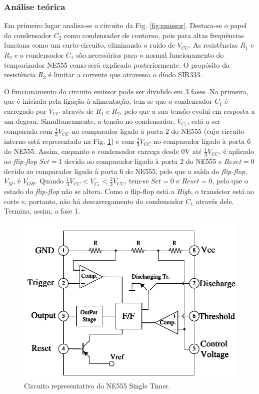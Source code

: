 \subsubsection{Análise teórica}

Em primeiro lugar analisa-se o circuito da Fig. \ref{fig:emissor}. Destaca-se o papel do condensador $C_2$ como condensador de contorno, pois para altas frequências funciona como um curto-circuito, eliminando o ruído de $V_{CC}$. As resistências $R_1$ e $R_2$ e o condensador $C_1$ são necessários para o normal funcionamento do temporizador NE555 como será explicado posteriormente. O propósito da resistência $R_3$ é limitar a corrente que atravessa o díodo SIR333.

O funcionamento do circuito emissor pode ser dividido em 3 fases. Na primeira, que é iniciada pela ligação à alimentação, tem-se que o condensador $C_1$ é carregado por $V_{CC}$ através de $R_1$ e $R_2$, pelo que a sua tensão evolui em resposta a um degrau. Simultaneamente, a tensão no condensador, $V_{C_1}$, está a ser comparada com $\frac{1}{3} V_{CC}$ no comparador ligado à porta 2 do NE555 (cujo circuito interno está representado na Fig. \ref{fig:timer}) e com $\frac{2}{3} V_{CC}$ no comparador ligado à porta 6 do NE555. Assim, enquanto o condensador carrega desde $0 \si{\volt}$ até $\frac{1}{3} V_{CC}$, é aplicado ao \textit{flip-flop} $\textit{Set} = 1$ devido ao comparador ligado à porta 2 do NE555 e $\textit{Reset} = 0$ devido ao comparador ligado à porta 6 do NE555, pelo que a saída do \textit{flip-flop}, $V_M$, é $V_{OH}$. Quando $\frac{1}{3} V_{CC} < V_{C_1} < \frac{2}{3} V_{CC}$, tem-se $\textit{Set} = 0$ e $\textit{Reset} = 0$, pelo que o estado do \textit{flip-flop} não se altera. Como o flip-flop está a \textit{High}, o transístor está ao corte e, portanto, não há descarregamento do condensador $C_1$ através dele. Termina, assim, a fase 1.

\begin{figure}[ht]
    \centering
    \includegraphics{Imagens/ne555_circuito.pdf}
    \caption{Circuito representativo do NE555 Single Timer.}
    \label{fig:timer}
\end{figure}

